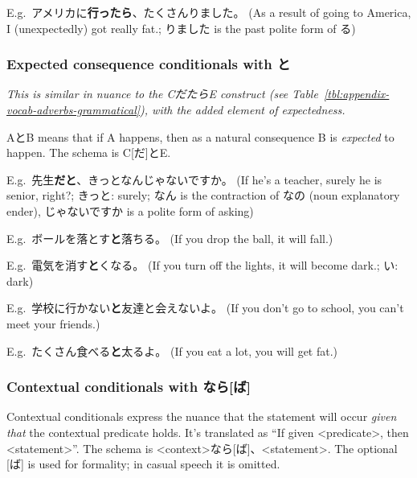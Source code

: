 \documentclass[../nihongo-gakushuu-kyouzai.tex]{subfiles}
\begin{document}
E.g.\ アメリカに\textbf{行ったら\textlightgrey{[ば]}}、たくさんりました。 (As a result of going to America, I (unexpectedly) got really fat.; りました is the past polite form of る)



\subsubsection{Expected consequence conditionals with と} \label{sec:expected-consequence-conditionals}
\emph{This is similar in nuance to the CだたらE construct (see Table~\ref{tbl:appendix-vocab-adverbs-grammatical}), with the added element of \emph{expectedness}.}

AとB means that if A happens, then as a natural consequence B is \emph{expected} to happen. The schema is C[だ]とE. 

E.g.\ 先生\textbf{だと}、きっとなんじゃないですか。 (If he's a teacher, surely he is senior, right?; きっと: surely; なん is the contraction of なの (noun explanatory ender), じゃないですか is a polite form of asking)

E.g.\ ボールを落とす\textbf{と}落ちる。 (If you drop the ball, it will fall.)

E.g.\ 電気を消す\textbf{と}くなる。 (If you turn off the lights, it will become dark.; い: dark)

E.g.\ 学校に行かない\textbf{と}友達と会えないよ。 (If you don't go to school, you can't meet your friends.)

E.g.\ たくさん食べる\textbf{と}太るよ。 (If you eat a lot, you will get fat.)


\subsubsection{Contextual conditionals with なら[ば]} \label{sec:contextual-conditionals}
Contextual conditionals express the nuance that the statement will occur \emph{given that} the contextual predicate holds. It's translated as ``If given <predicate>, then <statement>''. The schema is <context>なら[ば]、<statement>. The optional [ば] is used for formality; in casual speech it is omitted.
\end{document}
